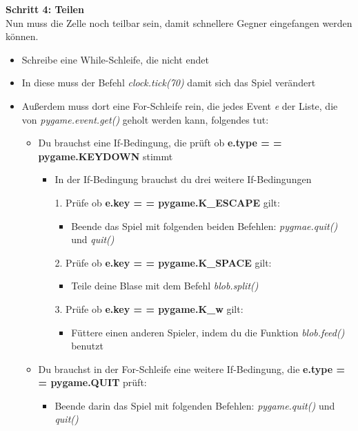 \textbf{Schritt 4: Teilen}\\
Nun muss die Zelle noch teilbar sein, damit schnellere Gegner eingefangen werden können.
\begin{itemize}
	\item Schreibe eine While-Schleife, die nicht endet
	\item In diese muss der Befehl \textit{clock.tick(70)} damit sich das Spiel verändert
	\item Außerdem muss dort eine For-Schleife rein, die jedes Event \textit{e} der Liste, die von \textit{pygame.event.get()} geholt werden kann, folgendes tut:
	\begin{itemize}
		\item Du brauchst eine If-Bedingung, die prüft ob \textbf{e.type = = pygame.KEYDOWN} stimmt
		\begin{itemize}
			\item In der If-Bedingung brauchst du drei weitere If-Bedingungen
			\item[1.] Prüfe ob \textbf{e.key = = pygame.K\_ESCAPE} gilt:
			\begin{itemize}
				\item Beende das Spiel mit folgenden beiden Befehlen: \textit{pygmae.quit()} und \textit{quit()}			
			\end{itemize}	
			\item[2.] Prüfe ob \textbf{e.key = = pygame.K\_SPACE} gilt:
			\begin{itemize}
				\item Teile deine Blase mit dem Befehl \textit{blob.split()}
			\end{itemize}					 
			\item[3.] Prüfe ob \textbf{e.key = = pygame.K\_w} gilt:
			\begin{itemize}
				\item Füttere einen anderen Spieler, indem du die Funktion \textit{blob.feed()} benutzt
			\end{itemize}
		\end{itemize}
		\item Du brauchst in der For-Schleife eine weitere If-Bedingung, die \textbf{e.type = = pygame.QUIT} prüft:
		\begin{itemize}
			\item Beende darin das Spiel mit folgenden Befehlen: \textit{pygame.quit()} und \textit{quit()}
		\end{itemize}
	\end{itemize}	 
\end{itemize}